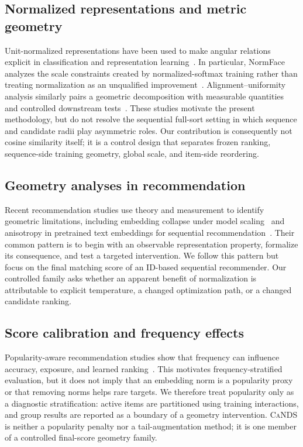 \documentclass[sigconf,anonymous,review]{acmart}
\newcommand{\cands}{\textsc{CaNDS}}
\begin{document}
\subsection{Normalized representations and metric geometry}
Unit-normalized representations have been used to make angular relations explicit in classification and representation learning~\cite{wang2017normface,davidson2018hyperspherical}. In particular, NormFace analyzes the scale constraints created by normalized-softmax training rather than treating normalization as an unqualified improvement~\cite{wang2017normface}. Alignment--uniformity analysis similarly pairs a geometric decomposition with measurable quantities and controlled downstream tests~\cite{wang2020alignment}. These studies motivate the present methodology, but do not resolve the sequential full-sort setting in which sequence and candidate radii play asymmetric roles. Our contribution is consequently not cosine similarity itself; it is a control design that separates frozen ranking, sequence-side training geometry, global scale, and item-side reordering.

\subsection{Geometry analyses in recommendation}
Recent recommendation studies use theory and measurement to identify geometric limitations, including embedding collapse under model scaling~\cite{guo2024collapse} and anisotropy in pretrained text embeddings for sequential recommendation~\cite{zhang2024whitenrec}. Their common pattern is to begin with an observable representation property, formalize its consequence, and test a targeted intervention. We follow this pattern but focus on the final matching score of an ID-based sequential recommender. Our controlled family asks whether an apparent benefit of normalization is attributable to explicit temperature, a changed optimization path, or a changed candidate ranking.

\subsection{Score calibration and frequency effects}
Popularity-aware recommendation studies show that frequency can influence accuracy, exposure, and learned ranking~\cite{steck2011popularity,abdollahpouri2017controlling}. This motivates frequency-stratified evaluation, but it does not imply that an embedding norm is a popularity proxy or that removing norms helps rare targets. We therefore treat popularity only as a diagnostic stratification: active items are partitioned using training interactions, and group results are reported as a boundary of a geometry intervention. \cands{} is neither a popularity penalty nor a tail-augmentation method; it is one member of a controlled final-score geometry family.
\end{document}
